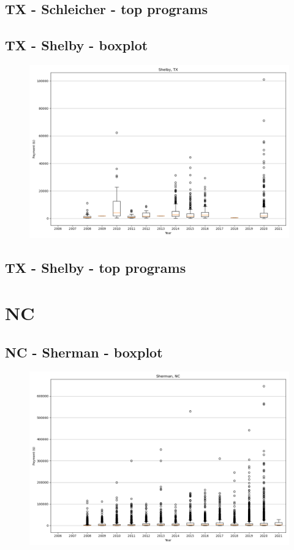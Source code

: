 \subsection*{TX - Schleicher - top programs}

\newpage
\subsection*{TX - Shelby - boxplot}
\begin{figure}[h]
\centering
\includegraphics[width=7in]{../output/boxplots/counties/Shelby-TX_boxplot.png}
\end{figure}


\subsection*{TX - Shelby - top programs}

\newpage
\section*{NC}
\subsection*{NC - Sherman - boxplot}
\begin{figure}[h]
\centering
\includegraphics[width=7in]{../output/boxplots/counties/Sherman-NC_boxplot.png}
\end{figure}


